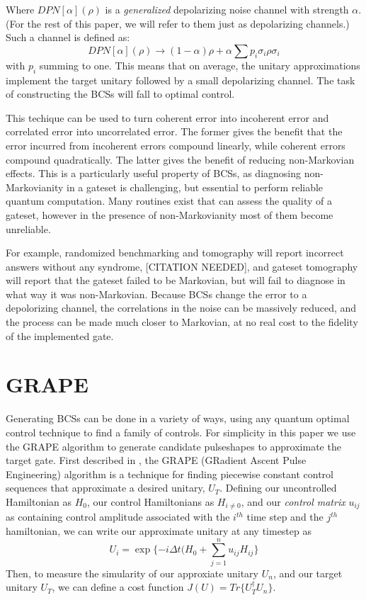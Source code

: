 \documentclass[aps,nofootinbib,pra,notitlepage,twocolumn]{revtex4-1}
\begin{document}
Where $DPN[\alpha](\rho)$ is a \textit{generalized} depolarizing noise channel with strength $\alpha$. (For the rest of this paper, we will refer to them just as depolarizing channels.) Such a channel is defined as:
\begin{equation}\label{eq:2}
  DPN[\alpha](\rho) \rightarrow (1-\alpha)\rho + \alpha\sum p_i \sigma_i\rho\sigma_i
\end{equation}
with $p_i$ summing to one. This means that on average, the unitary approximations implement the target unitary followed by a small depolarizing channel. The task of constructing the BCSs will fall to optimal control.

This techique can be used to turn coherent error into incoherent error and correlated error into uncorrelated error. The former gives the benefit that the error incurred from incoherent errors compound linearly, while coherent errors compound quadratically. The latter gives the benefit of reducing non-Markovian effects. This is a particularly useful property of BCSs, as diagnosing non-Markovianity in a gateset is challenging, but essential to perform reliable quantum computation. Many routines exist that can assess the quality of a gateset, however in the presence of non-Markovianity most of them become unreliable.

For example, randomized benchmarking and tomography will report incorrect answers without any syndrome, [CITATION NEEDED], and gateset tomography will report that the gateset failed to be Markovian, but will fail to diagnose in what way it was non-Markovian. Because BCSs change the error to a depolorizing channel, the correlations in the noise can be massively reduced, and the process can be made much closer to Markovian, at no real cost to the fidelity of the implemented gate.

\section{GRAPE}\label{GRAPE}
Generating BCSs can be done in a variety of ways, using any quantum optimal control technique \cite{Caneva2011, Machnes2018} to find a family of controls. For simplicity in this paper we use the GRAPE algorithm to generate candidate pulseshapes to approximate the target gate. First described in \cite{Khaneja2005}, the GRAPE (GRadient Ascent Pulse Engineering) algorithm is a technique for finding piecewise constant control sequences that approximate a desired unitary, $U_T$. Defining our uncontrolled Hamiltonian as $H_0$, our control Hamiltonians as $H_{i\neq 0}$, and our \textit{control matrix} $u_{ij}$ as containing control amplitude associated with the $i^{th}$ time step and the $j^{th}$ hamiltonian, we can write our approximate unitary at any timestep as
\begin{equation}\label{eq:3}
  U_i = \exp\{-i\Delta t(H_0 + \sum_{j=1}^{n}u_{ij}H_{ij}\}
\end{equation}
Then, to measure the simularity of our approxiate unitary $U_n$, and our target unitary $U_T$, we can define a cost function $J(U) = Tr\{U_T^{\dagger}U_n\}$.
\end{document}
